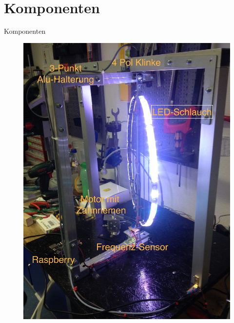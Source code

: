 \section{Komponenten}
\begin{frame}{Komponenten}
\vspace*{-1.35cm}
\begin{figure}
\hspace*{3cm}
\includegraphics[height=1.19\textheight]{Plots/Komponenten.jpg}
\end{figure}
\end{frame}


